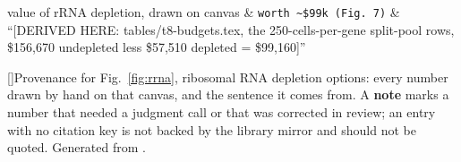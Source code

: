 \begin{longtable}
\addlinespace[2.5pt]
value of rRNA depletion, drawn on canvas & \texttt{worth \textasciitilde{}\$99k (Fig. 7)} & ``[DERIVED HERE: tables/t8-budgets.tex, the 250-cells-per-gene split-pool rows, \$156,670 undepleted less \$57,510 depleted = \$99,160]''  \\
\addlinespace[2.5pt]
\end{longtable}
\endgroup
\vspace{0.6em}
\begingroup\scriptsize
\setlength{\LTleft}{0pt}\setlength{\LTright}{0pt}
\begingroup\captionsetup{type=table}
[]{Provenance for Fig.~\ref{fig:rrna}, ribosomal RNA depletion options: every number drawn by hand on that canvas, and the sentence it comes from. A \textbf{note} marks a number that needed a judgment call or that was corrected in review; an entry with no citation key is not backed by the library mirror and should not be quoted. Generated from .}\label{tab:prov-rrna-depletion-options}
\endgroup
